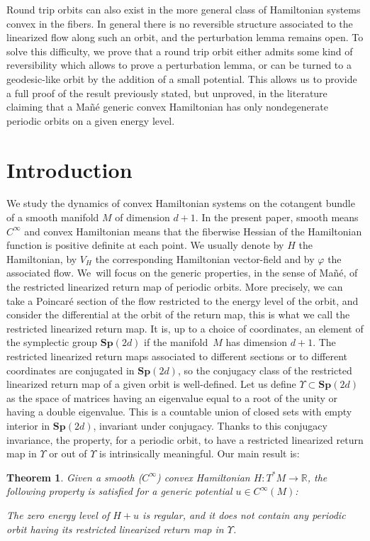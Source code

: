 \documentclass[11pt]{article}
\newcommand{\Rm}{\mathbb{R}}
\newcommand{\Sp}{\mathbf{Sp}}
\theoremstyle{plain}
\newtheorem{thm}{Theorem}
\theoremstyle{definition}
\begin{document}
Round trip orbits can also exist in the more general class of
Hamiltonian systems convex in the fibers. In general there is no reversible structure associated to the linearized flow along such an orbit, and the perturbation lemma remains open.
To solve this difficulty, we prove that a round trip orbit either admits some kind of reversibility which allows to prove a perturbation lemma, or can be turned to a geodesic-like orbit by the addition of a small potential.
This allows us to provide a full proof of the result previously stated, but unproved, in the literature claiming that a Mañé generic convex Hamiltonian has only nondegenerate periodic orbits on a given energy level.

\section{Introduction}

We study the dynamics of convex Hamiltonian systems on the cotangent bundle of a smooth manifold $M$ of dimension $d+1$.
In the present paper, smooth means $C^{\infty}$ and convex Hamiltonian means that the fiberwise Hessian
of the Hamiltonian function is positive definite at each point.
We usually denote by $H$ the Hamiltonian, by $V_H$ the corresponding Hamiltonian vector-field and by $\varphi$ the associated flow. We~will focus on the generic properties, in the sense of Mañé, of the restricted linearized return map of periodic orbits.
More precisely, we can take a Poincaré section
of the flow restricted to the energy level of the orbit, and consider the differential at the orbit of the return map, this is what we call the restricted linearized return map.
It is, up to a choice of coordinates, an element of the symplectic group $\Sp(2d)$ if
the manifold~$M$ has dimension $d+1$.
The restricted linearized return maps associated to different sections or to different coordinates are conjugated in $\Sp(2d)$, so the conjugacy class of the restricted linearized return map of a given orbit is well-defined.
Let us define $\Upsilon \subset \Sp(2d)$ as the space of matrices having an eigenvalue equal to a root of the unity or having a double eigenvalue. This is a countable union of closed sets with empty interior in $\Sp(2d)$, invariant under conjugacy.
Thanks to this conjugacy invariance, the property, for a periodic orbit, to have a restricted linearized return map in
$\Upsilon$ or out of $\Upsilon$ is intrinsically meaningful.
Our main result is:

\begin{thm}\label{thm-g1}
Given a smooth ($C^{\infty}$) convex Hamiltonian $H: T^*M\rightarrow \Rm$,
the following property is satisfied for a generic potential $u\in C^{\infty}(M)$:

The zero energy level of $H+u$ is regular, and it does not contain any periodic orbit having its restricted linearized return map in $\Upsilon$.
\end{thm}
\end{document}
